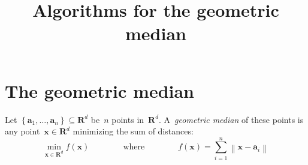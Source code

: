 
\newcommand{\ud}{\mathrm{d}}
\newcommand{\R}{\mathbf{R}}

\newcommand{\x}{\mathbf{x}}
\newcommand{\y}{\mathbf{y}}
\newcommand{\p}{\mathbf{p}}

\newcommand{\1}{\textbf{1}}

 \def\R{\textbf{R}}
 \def\C{\textbf{C}}
 \def\N{\textbf{N}}
 \def\T{\textbf{T}}
 \def\x{\textbf{x}}
 \def\a{\textbf{a}}
 \def\y{\textbf{y}}
 \def\m{\textbf{m}}
 \def\b{\textbf{b}}
 \def\u{\textbf{u}}
 \def\Z{\textbf{Z}}

\def\F{\mathcal{F}}
\def\d{\mathrm{d}}
\newcommand{\med}[0]{\mathrm{med}}
\newcommand{\reference}[1] {{\scriptsize \color{gray}{#1}}}
\newcommand{\referenceq}[1] {{\tiny \color{gray}[{#1}]}}
\newcommand{\referencep}[1] {{\tiny \color{gray}  #1 }}
\newcommand{\unit}[1] {{\tiny \color{gray}  #1 }}

\newcommand{\parens}[1]{\left(#1\right)} %
\newcommand{\pairing}[2]{\left\langle #1,\,#2\right\rangle} %

\newcommand{\abs}[1]{\left|#1\right|}
\newcommand{\Abs}[1]{\left\|#1\right\|}
\newcommand{\ABS}[1]{{\left\vert\kern-0.25ex\left\vert\kern-0.25ex\left\vert #1 \right\vert\kern-0.25ex\right\vert\kern-0.25ex\right\vert}}



\title{Algorithms for the geometric median}


\section{The geometric median}

\begin{definition}
Let
\(
	\left\{\a_1,\ldots,\a_n\right\}\subseteq\R^d
\)
be~$n$ points in~$\R^d$.
A~\emph{geometric median} of these points is any point~$\x\in\R^d$ minimizing
the sum of distances:
\begin{equation}\label{eq:objective}
	\min_{\x\in\R^d} f(\x)
	\qquad
	\qquad
	\textrm{where}
	\qquad
	\qquad
	f(\x) = \sum_{i=1}^n \left\|\x-\a_i\right\|
\end{equation}
\end{definition}

